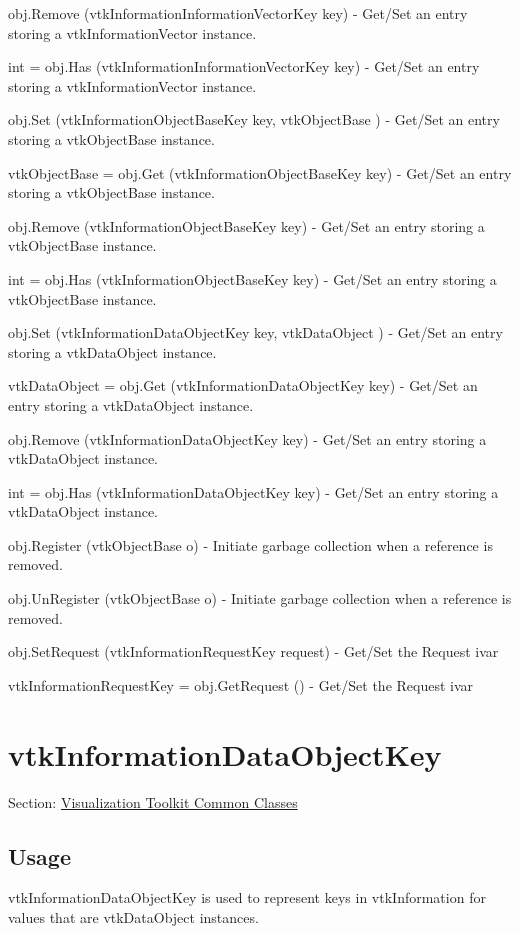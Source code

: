 \begin{DoxyItemize}
\item {\ttfamily obj.\-Remove (vtk\-Information\-Information\-Vector\-Key key)} -\/ Get/\-Set an entry storing a vtk\-Information\-Vector instance.  
\item {\ttfamily int = obj.\-Has (vtk\-Information\-Information\-Vector\-Key key)} -\/ Get/\-Set an entry storing a vtk\-Information\-Vector instance.  
\item {\ttfamily obj.\-Set (vtk\-Information\-Object\-Base\-Key key, vtk\-Object\-Base )} -\/ Get/\-Set an entry storing a vtk\-Object\-Base instance.  
\item {\ttfamily vtk\-Object\-Base = obj.\-Get (vtk\-Information\-Object\-Base\-Key key)} -\/ Get/\-Set an entry storing a vtk\-Object\-Base instance.  
\item {\ttfamily obj.\-Remove (vtk\-Information\-Object\-Base\-Key key)} -\/ Get/\-Set an entry storing a vtk\-Object\-Base instance.  
\item {\ttfamily int = obj.\-Has (vtk\-Information\-Object\-Base\-Key key)} -\/ Get/\-Set an entry storing a vtk\-Object\-Base instance.  
\item {\ttfamily obj.\-Set (vtk\-Information\-Data\-Object\-Key key, vtk\-Data\-Object )} -\/ Get/\-Set an entry storing a vtk\-Data\-Object instance.  
\item {\ttfamily vtk\-Data\-Object = obj.\-Get (vtk\-Information\-Data\-Object\-Key key)} -\/ Get/\-Set an entry storing a vtk\-Data\-Object instance.  
\item {\ttfamily obj.\-Remove (vtk\-Information\-Data\-Object\-Key key)} -\/ Get/\-Set an entry storing a vtk\-Data\-Object instance.  
\item {\ttfamily int = obj.\-Has (vtk\-Information\-Data\-Object\-Key key)} -\/ Get/\-Set an entry storing a vtk\-Data\-Object instance.  
\item {\ttfamily obj.\-Register (vtk\-Object\-Base o)} -\/ Initiate garbage collection when a reference is removed.  
\item {\ttfamily obj.\-Un\-Register (vtk\-Object\-Base o)} -\/ Initiate garbage collection when a reference is removed.  
\item {\ttfamily obj.\-Set\-Request (vtk\-Information\-Request\-Key request)} -\/ Get/\-Set the Request ivar  
\item {\ttfamily vtk\-Information\-Request\-Key = obj.\-Get\-Request ()} -\/ Get/\-Set the Request ivar  
\end{DoxyItemize}\hypertarget{vtkcommon_vtkinformationdataobjectkey}{}\section{vtk\-Information\-Data\-Object\-Key}\label{vtkcommon_vtkinformationdataobjectkey}
Section\-: \hyperlink{sec_vtkcommon}{Visualization Toolkit Common Classes} \hypertarget{vtkwidgets_vtkxyplotwidget_Usage}{}\subsection{Usage}\label{vtkwidgets_vtkxyplotwidget_Usage}
vtk\-Information\-Data\-Object\-Key is used to represent keys in vtk\-Information for values that are vtk\-Data\-Object instances.

